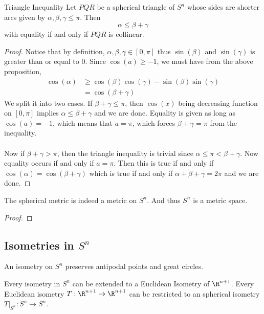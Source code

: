 \documentclass[a4paper]{article}
\begin{document}
\begin{prp}{Triangle Inequality}{} Let $PQR$ be a spherical triangle of $S^n$ whose sides are shorter arcs given by $\alpha,\beta,\gamma\leq\pi$. Then $$\alpha\leq\beta+\gamma$$ with equality if and only if $PQR$ is collinear. \tcbline
\begin{proof}
Notice that by definition, $\alpha,\beta,\gamma\in[0,\pi]$ thus $\sin(\beta)$ and $\sin(\gamma)$ is greater than or equal to $0$. Since $\cos(a)\geq-1$, we must have from the above proposition, 
\begin{align*}
\cos(\alpha)&\geq\cos(\beta)\cos(\gamma)-\sin(\beta)\sin(\gamma)\\
&=\cos(\beta+\gamma)
\end{align*}
We split it into two cases. If $\beta+\gamma\leq\pi$, then $\cos(x)$ being decreasing function on $[0,\pi]$ implies $\alpha\leq\beta+\gamma$ and we are done. Equality is given as long as $\cos(a)=-1$, which means that $a=\pi$, which forces $\beta+\gamma=\pi$ from the inequality. \\~\\
Now if $\beta+\gamma>\pi$, then the triangle inequality is trivial since $\alpha\leq\pi<\beta+\gamma$. Now equality occurs if and only if $a=\pi$. Then this is true if and only if $\cos(\alpha)=\cos(\beta+\gamma)$ which is true if and only if $\alpha+\beta+\gamma=2\pi$ and we are done. 
\end{proof}
\end{prp}

\begin{prp}{}{} The spherical metric is indeed a metric on $S^n$. And thus $S^n$ is a metric space. \tcbline
\begin{proof}
\end{proof}
\end{prp}

\subsection{Isometries in $S^n$}
\begin{prp}{}{} An isometry on $S^n$ preserves antipodal points and great circles. 
\end{prp}

\begin{prp}{}{} Every isometry in $S^n$ can be extended to a Euclidean Isometry of $\R^{n+1}$. Every Euclidean isometry $T:\R^{n+1}\to\R^{n+1}$ can be restricted to an spherical isometry $T|_{S^n}:S^n\to S^n$. 
\end{prp}
\end{document}
